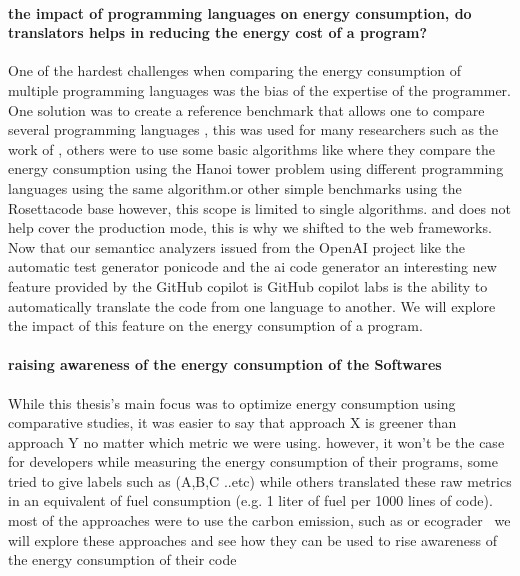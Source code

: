 \paragraph{the impact of programming languages on energy consumption, do translators helps in reducing the energy cost of a program?}
One of the hardest challenges when comparing the energy consumption of multiple programming languages was the bias of the expertise of the programmer. One solution was to create a reference benchmark that allows one to compare several programming languages , this was used for many researchers such as the work of \citeauthor{couto2017towards} \cite{couto2017towards}, others were to use some basic algorithms like \cite{noureddine_preliminary_2012} where they compare the energy consumption using the Hanoi tower problem  using different programming languages using the same algorithm.or other simple benchmarks using the Rosettacode base 
however, this scope is limited to single algorithms. and does not help cover the production mode, this is why we shifted to the web frameworks.  Now that our semanticc analyzers issued from the OpenAI project like the automatic test generator ponicode and the ai code generator 
an interesting new feature provided by the GitHub copilot is GitHub copilot labs is the ability to automatically translate the code from one language to another. We will explore the impact of this feature on the energy consumption of a program.


\paragraph{raising awareness of the energy consumption of the Softwares}
While this thesis's main focus was to optimize energy consumption using comparative studies, it was easier to say that approach X is greener than approach Y no matter which metric we were using. however, it won't be the case for developers while measuring the energy consumption of their programs, some tried to give labels such as (A,B,C ..etc) while others translated these raw metrics in an equivalent of fuel consumption (e.g. 1 liter of fuel per 1000 lines of code). most of the approaches were to use the carbon emission, such as\cite{patterson2021carbon} or ecograder~
we will explore these approaches and see how they can be used to rise awareness of the energy consumption of their code



